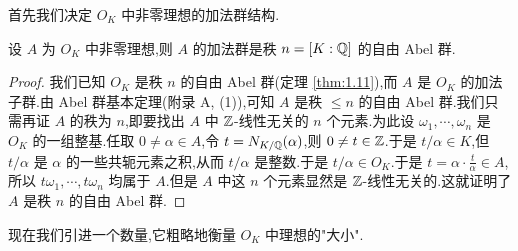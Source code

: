 首先我们决定 $O_K$ 中非零理想的加法群结构.

\begin{lemma}\label{lem:ch2-9}
设 $A$ 为 $O_K$ 中非零理想,则 $A$ 的加法群是秩 $n=[K:\mathbb{Q}]$ 的自由 Abel 群.
\end{lemma}

\begin{proof}
我们已知 $O_K$ 是秩 $n$ 的自由 Abel 群(定理 \ref{thm:1.11}),而 $A$ 是 $O_K$ 的加法子群.由 Abel 群基本定理(附录 A, (1)),可知 $A$ 是秩 $\leqslant n$ 的自由 Abel 群.我们只需再证 $A$ 的秩为 $n$,即要找出 $A$ 中 $\mathbb{Z}$-线性无关的 $n$ 个元素.为此设 $\omega_1,\cdots,\omega_n$ 是 $O_K$ 的一组整基.任取 $0\neq\alpha\in A$,令 $t=N_{K/\mathbb{Q}}(\alpha)$,则 $0\neq t\in\mathbb{Z}$.于是 $t/\alpha\in K$,但 $t/\alpha$ 是 $\alpha$ 的一些共轭元素之积,从而 $t/\alpha$ 是整数.于是 $t/\alpha\in O_K$.于是 $t=\alpha\cdot\frac{t}{\alpha}\in A$,所以 $t\omega_1,\cdots,t\omega_n$ 均属于 $A$.但是 $A$ 中这 $n$ 个元素显然是 $\mathbb{Z}$-线性无关的.这就证明了 $A$ 是秩 $n$ 的自由 Abel 群.
\end{proof}

现在我们引进一个数量,它粗略地衡量 $O_K$ 中理想的"大小".

